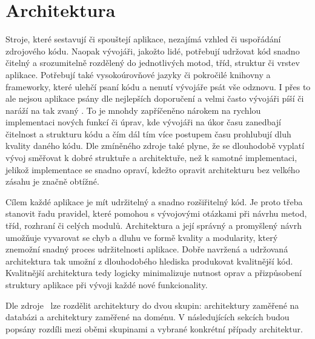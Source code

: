 \section{Architektura}

Stroje,
které sestavují či spouštejí aplikace,
nezajímá vzhled či uspořádání zdrojového kódu.
Naopak vývojáři,
jakožto lidé,
potřebují udržovat kód snadno čitelný a srozumitelně rozdělený do jednotlivých
motod, tříd, struktur či vrstev aplikace.
Potřebují také vysokoúrovňové jazyky či pokročilé knihovny a frameworky,
které ulehčí psaní kódu a nenutí vývojáře psát vše odznovu.
I přes to ale nejsou aplikace psány dle nejlepších doporučení
a velmi často vývojáři píší či naráží na tak zvaný .
To je mnohdy zapříčeněno nárokem na rychlou implementaci nových funkcí či úprav,
kde vývojáři na úkor času zanedbají čitelnost a strukturu kódu
a čím dál tím více postupem času prohlubují dluh kvality daného kódu.
\cite{architecture}
\cite[kapitola~15]{martin_clean_architecture}
Dle zmíněného zdroje také plyne,
že se dlouhodobě vyplatí vývoj směřovat k dobré struktuře a architektuře,
než k samotné implementaci,
jelikož implementace se snadno opraví,
kdežto opravit architekturu bez velkého zásahu je značně obtížné.
\cite{martin_clean_architecture}

Cílem každé aplikace je mít udržitelný a snadno rozšiřitelný kód.
Je proto třeba stanovit řadu pravidel,
které pomohou s vývojovými otázkami při návrhu metod, tříd, rozhraní či
celých modulů.
Architektura a její správný a promyšlený návrh umožňuje vyvarovat
se chyb a dluhu ve formě kvality a modularity,
který znemožní snadný proces udržitelnosti aplikace.
\cite[kapitola~15]{martin_clean_architecture}
Dobře navržená a udržovaná architektura tak umožní z dlouhodobého hlediska
produkovat kvalitnější kód.
Kvalitnější architektura tedy logicky minimalizuje nutnost oprav a
přizpůsobení struktury aplikace při vývoji každé nové funkcionality.

Dle zdroje~\cite{architecture} lze rozdělit architektury do dvou skupin:
architektury zaměřené na databázi a architektury zaměřené na doménu.
V následujících sekcích budou popsány rozdíli mezi oběmi skupinami
a vybrané konkrétní případy architektur.

